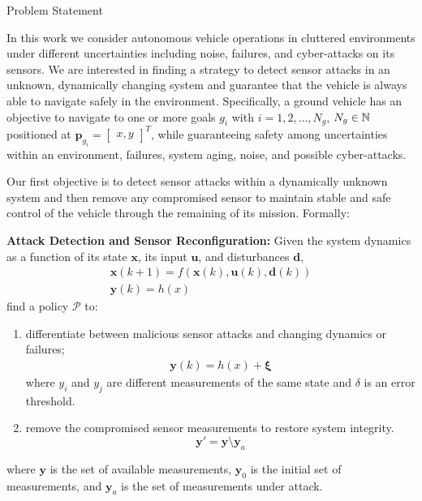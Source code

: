 \begin{section}{Problem Statement}
	
\label{sec:problem}

In this work we consider autonomous vehicle operations in cluttered environments under different uncertainties including noise, failures, and cyber-attacks on its sensors. 
We are interested in finding a strategy to detect sensor attacks in an unknown, dynamically changing system and guarantee that the vehicle is always able to navigate safely in the environment. Specifically, a ground vehicle has an objective to navigate to one or more goals $g_i$ with $ i = 1, 2, \dots, N_g$, $N_g \in \mathbb{N}$ positioned at $\bm{p}_{g_i}={\begin{bmatrix} x,y \end{bmatrix}}^T$, while guaranteeing safety among uncertainties within an environment, failures, system aging, noise, and possible cyber-attacks.



Our first objective is to detect sensor attacks within a dynamically unknown system and then remove any compromised sensor to maintain stable and safe control of the vehicle through the remaining of its mission. Formally:

\begin{problem} 
\label{problem1} {\textbf{Attack Detection and Sensor Reconfiguration:}} 
 Given the system dynamics as a function of its state $ \bm{x} $, its input $ \bm{u}$, and disturbances $ \bm{d} $,
	\begin{equation}
	\begin{split}
		\bm{x}(k+1) = f(\bm{x}(k), \bm{u}(k), \bm{d}(k)) \\
		\bm{y}(k)=h(x)
    \end{split}
	\end{equation}
find a policy $\mathcal{P}$ to:
\begin{enumerate}
	\item differentiate between malicious sensor attacks and changing dynamics or failures; 
	\begin{equation}
	\begin{split}
	\label{eq:detect_attack}
	    \bm{y}(k)=h(x) + \bm{\xi}
	\end{split}    
	\end{equation}
	where $y_i$ and $y_j$ are different measurements of the same state and $\delta$ is an error threshold.
	\item remove the compromised sensor measurements to restore system integrity.
	\begin{equation}
	\label{eq:remove_sensors}
	    \bm{y}'=\bm{y} \setminus \bm{y}_a
	\end{equation}
\end{enumerate}
where $\bm{y}$ is the set of available measurements, $\bm{y}_0$ is the initial set of measurements, and $\bm{y}_a$ is the set of measurements under attack.



\end{problem}
\end{section}
